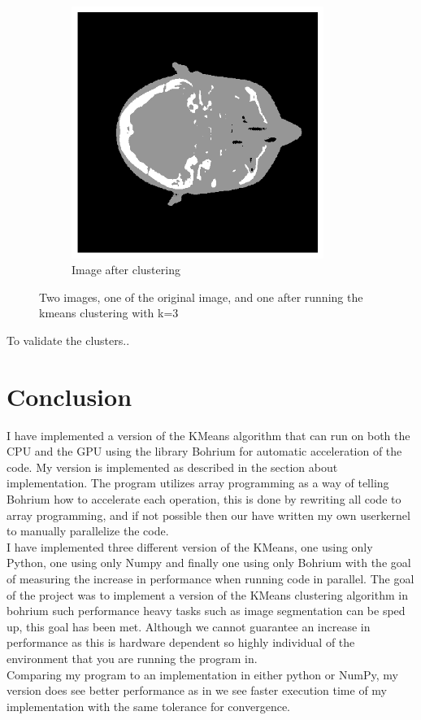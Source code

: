 \documentclass[12pt]{report}
\begin{document}
\begin{figure}[h]
\begin{subfigure}[t]{0.5\textwidth}
        \includegraphics[width=0.9\textwidth]{images/clustering512.png}
        \caption{Image after clustering}
    \end{subfigure}
    \caption{Two images, one of the original image, and one after running the kmeans clustering with k=3}
\end{figure}
To validate the clusters..




\chapter{Conclusion}
\label{sec:label}
I have implemented a version of the KMeans algorithm that can run on both the CPU and the GPU using the library Bohrium for automatic acceleration of the code. My version is implemented as described in the section about implementation. The program utilizes array programming as a way of telling Bohrium how to accelerate each operation, this is done by rewriting all code to array programming, and if not possible then our have written my own userkernel to manually parallelize the code. \\
I have implemented three different version of the KMeans, one using only Python, one using only Numpy and finally one using only Bohrium with the goal of measuring the increase in performance when running code in parallel. The goal of the project was to implement a version of the KMeans clustering algorithm in bohrium such performance heavy tasks such as image segmentation can be sped up, this goal has been met. Although we cannot guarantee an increase in performance as this is hardware dependent so highly individual of the environment that you are running the program in. \\
Comparing my program to an implementation in either python or NumPy, my version does see better performance as in we see faster execution time of my implementation with the same tolerance for convergence. \\ \\
\end{document}

